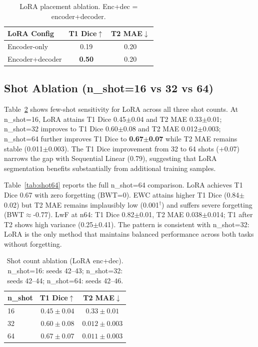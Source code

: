 \documentclass[journal,twoside,web]{ieeecolor}
\begin{document}
\begin{table}[t]
\caption{LoRA placement ablation. Enc+dec = encoder+decoder.}
\label{tab:lora_ablation}
\centering
\begin{tabular}{lcc}
\toprule
LoRA Config & T1 Dice$\uparrow$ & T2 MAE$\downarrow$ \\
\midrule
Encoder-only & 0.19 & 0.20 \\
Encoder+decoder & \textbf{0.50} & 0.20 \\
\bottomrule
\end{tabular}
\end{table}

\subsection{Shot Ablation (n\_shot=16 vs 32 vs 64)}
\label{sec:shot}

Table~\ref{tab:shot} shows few-shot sensitivity for LoRA across all three shot counts. At n\_shot=16, LoRA attains T1 Dice 0.45$\pm$0.04 and T2 MAE 0.33$\pm$0.01; n\_shot=32 improves to T1 Dice 0.60$\pm$0.08 and T2 MAE 0.012$\pm$0.003; n\_shot=64 further improves T1 Dice to \textbf{0.67$\pm$0.07} while T2 MAE remains stable (0.011$\pm$0.003). The T1 Dice improvement from 32 to 64 shots (+0.07) narrows the gap with Sequential Linear (0.79), suggesting that LoRA segmentation benefits substantially from additional training samples.

Table~\ref{tab:shot64} reports the full n\_shot=64 comparison. LoRA achieves T1 Dice 0.67 with zero forgetting (BWT=0). EWC attains higher T1 Dice (0.84$\pm$0.02) but T2 MAE remains implausibly low (0.001$^\dagger$) and suffers severe forgetting (BWT$\approx$-0.77). LwF at n64: T1 Dice 0.82$\pm$0.01, T2 MAE 0.038$\pm$0.014; T1 after T2 shows high variance (0.25$\pm$0.41). The pattern is consistent with n\_shot=32: LoRA is the only method that maintains balanced performance across both tasks without forgetting.

\begin{table}[t]
\caption{Shot count ablation (LoRA enc+dec). n\_shot=16: seeds 42--43; n\_shot=32: seeds 42--44; n\_shot=64: seeds 42--46.}
\label{tab:shot}
\centering
\begin{tabular}{lcc}
\toprule
n\_shot & T1 Dice$\uparrow$ & T2 MAE$\downarrow$ \\
\midrule
16 & $0.45 \pm 0.04$ & $0.33 \pm 0.01$ \\
32 & $0.60 \pm 0.08$ & $0.012 \pm 0.003$ \\
64 & $\mathbf{0.67 \pm 0.07}$ & $\mathbf{0.011 \pm 0.003}$ \\
\bottomrule
\end{tabular}
\end{table}
\end{document}
